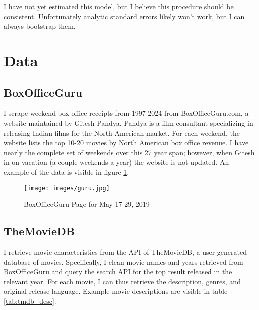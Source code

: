 \documentclass{article}
\begin{document}
I have not yet estimated this model, but I believe this procedure should be consistent. Unfortunately analytic standard errors likely won't work, but I can always bootstrap them. 

\section{Data}

\subsection{BoxOfficeGuru}

I scrape weekend box office receipts from 1997-2024 from BoxOfficeGuru.com, a website maintained by Gitesh Pandya. Pandya is a film consultant specializing in releasing Indian films for the North American market. For each weekend, the website lists the top 10-20 movies by North American box office revenue. I have nearly the complete set of weekends over this 27 year span; however, when Gitesh in on vacation (a couple weekends a year) the website is not updated. An example of the data is visible in figure \ref{fig:guru}.

\begin{figure}
    \texttt{[image: images/guru.jpg]}
    \caption{BoxOfficeGuru Page for May 17-29, 2019}
    \label{fig:guru}
\end{figure}


\subsection{TheMovieDB}

I retrieve movie characteristics from the API of TheMovieDB, a user-generated database of movies. Specifically, I clean movie names and years retrieved from BoxOfficeGuru and query the search API for the top result released in the relevant year. For each movie, I can thus retrieve the description, genres, and original release language. Example movie descriptions are visible in table \ref{tab:tmdb_desc}.
\end{document}
